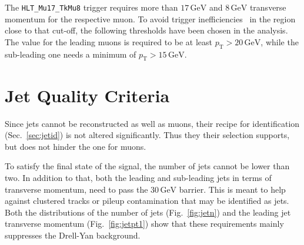 The \verb+HLT_Mu17_TkMu8+ trigger requires more than $17\,\text{GeV}$ and $8\,\text{GeV}$ transverse momentum for the respective muon. To avoid trigger inefficiencies~\cite{trigeff} in the region close to that cut-off, the following thresholds have been chosen in the analysis. The value for the leading muons is required to be at least $p_{\text{T}} > 20\,\text{GeV}$, while the sub-leading one needs a minimum of $p_{\text{T}} > 15\,\text{GeV}$.

\section{Jet Quality Criteria}
\label{sec:jetqualy}

Since jets cannot be reconstructed as well as muons, their recipe for identification (Sec.~\ref{sec:jetid}) is not altered significantly. Thus they their selection supports, but does not hinder the one for muons.

To satisfy the final state of the signal, the number of jets cannot be lower than two. In addition to that, both the leading and sub-leading jets in terms of transverse momentum, need to pass the $30\,\text{GeV}$ barrier. This is meant to help against clustered tracks or pileup contamination that may be identified as jets. Both the distributions of the number of jets (Fig.~\ref{fig:jetn}) and the leading jet transverse momentum (Fig.~\ref{fig:jetpt1}) show that these requirements mainly suppresses the Drell-Yan background.

